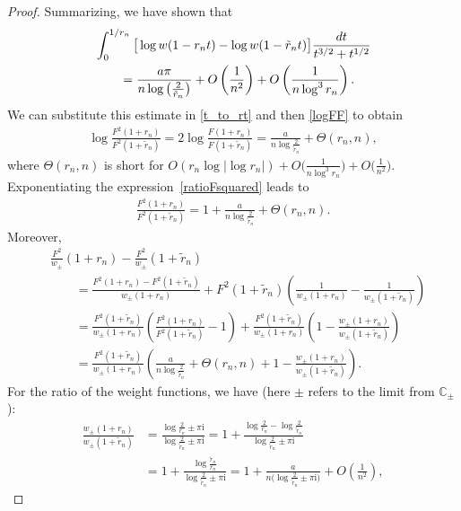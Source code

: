 \documentclass[11pt]{article}
\numberwithin{equation}{section}
\newcommand{\C}{\mathbb{C}}
\newcommand{\I}{\mathrm{i}}
\numberwithin{equation}{section}
\begin{document}
\begin{proof}
Summarizing, we have shown that
\begin{align*}
& \int_0^{1/r_n} \big[\log w(1-r_n t)- \log w(1-\tilde r_n t)\big] \frac{{\rm d}t}{t^{3/2}+t^{1/2}}
 \\
 &\qquad= \frac{a\pi}{n\log \big(\frac{2}{\tilde r_n }\big)} + O\left(\frac{1}{n^2}\right) + O\left(\frac{1}{n \log^3 r_n} \right).
\end{align*}
We can substitute this estimate in \eqref{t_to_rt} and then \eqref{logFF} to obtain
\begin{align}\label{ratioFsquared}
 \log\frac{F^2(1+r_n)}{F^2(1+\tilde r_n)} = 2 \log \frac{F(1+r_n)}{F(1+\tilde r_n)} = \frac{a}{ n\log \frac{2}{\tilde r_n} } + \Theta(r_n, n),
\end{align}
where $\Theta(r_n, n)$ is short for $O(r_n \log |\log r_n|) + O\big(\frac{1}{n\log^3 r_n}\big) +O\big(\frac{1}{n^2}\big)$. Exponentiating the expression~\eqref{ratioFsquared} leads to
\begin{align*}
 \frac{F^2(1+r_n)}{F^2(1+\tilde r_n)} = 1 + \frac{a}{ n\log \frac{2}{\tilde r_n} } + \Theta(r_n, n).
\end{align*}
Moreover,
\begin{align}
& \frac{F^2}{w_\pm}(1+r_n) - \frac{F^2}{w_\pm}(1+\tilde r_n)
\nonumber \\
 &\qquad = \frac{F^2(1+r_n)-F^2(1+\tilde r_n)}{w_\pm(1+r_n)} + F^2(1+\tilde r_n)\left(\frac{1}{w_\pm(1+r_n)}-\frac{1}{w_\pm(1+\tilde r_n)}\right)
\nonumber \\
 &\qquad = \frac{F^2(1+\tilde r_n)}{w_\pm(1+r_n)}\left(\frac{F^2(1+r_n)}{F^2(1+\tilde r_n)}-1\right) + \frac{F^2(1+\tilde r_n)}{w_\pm(1+r_n)}\left(1-\frac{w_\pm(1+r_n)}{w_\pm(1+\tilde r_n)}\right)
\nonumber \\
 &\qquad = \frac{F^2(1+\tilde r_n)}{w_\pm(1+r_n)}\left(\frac{a}{n\log \frac{2}{\tilde r_n}} + \Theta(r_n, n)+ 1-\frac{w_\pm(1+r_n)}{w_\pm(1+\tilde r_n)}\right).\label{FTheta}
\end{align}
For the ratio of the weight functions, we have (here $\pm$ refers to the limit from $\C_\pm$):
\begin{align*}
 \frac{w_\pm(1+r_n)}{w_\pm(1+\tilde r_n)} &= \frac{\log \frac{2}{r_n}\pm \pi \I}{\log \frac{2}{\tilde r_n}\pm \pi \I} = 1 + \frac{\log \frac{2}{r_n}-\log\frac{2}{\tilde r_n}}{\log \frac{2}{\tilde r_n}\pm \pi \I}
 \\
 &= 1+ \frac{\log \frac{\tilde r_n}{r_n}}{\log \frac{2}{\tilde r_n}\pm \pi \I} = 1 + \frac{a}{n\big(\log \frac{2}{\tilde r_n}\pm \pi \I\big)}+ O\left(\frac{1}{n^2}\right),
\end{align*}

\end{proof}
\end{document}
